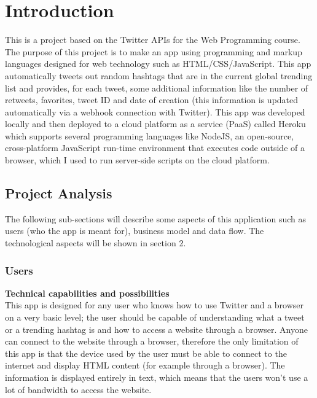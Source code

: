 \documentclass[12pt]{article} %
\begin{document}
\newpage %


\section{Introduction} %

This is a project based on the Twitter APIs for the Web Programming course.
\newline
The purpose of this project is to make an app using programming and markup languages designed for web technology such as HTML/CSS/JavaScript.
\newline
This app automatically tweets out random hashtags that are in the current global trending list
and provides, for each tweet, some additional information like the number of retweets, favorites, tweet ID and date of
creation (this information is updated automatically via a webhook connection with Twitter).
This app was developed locally and then deployed to a cloud platform as a service (PaaS) called Heroku which supports several
programming languages like NodeJS, an open-source, cross-platform JavaScript run-time environment that executes code 
outside of a browser, which I used to run server-side scripts on the cloud platform.


\subsection{Project Analysis} %

The following sub-sections will describe some aspects of this application such as users (who the app is meant for), business model and
data flow. The technological aspects will be shown in section 2.



\subsubsection{Users} %

\textbf{Technical capabilities and possibilities}
\\[0.3cm]
This app is designed for any user who knows how to use Twitter and a browser on a very basic level; the user 
should be capable of understanding what a tweet or a trending hashtag is and how to access a website through a browser.
Anyone can connect to the website through a browser, therefore the only limitation of this app is that the device used by the user
must be able to connect to the internet and display HTML content (for example through a browser). 
The information is displayed entirely in text, which means that the users won't use a lot of bandwidth to access the website.
\pagebreak
\end{document}
